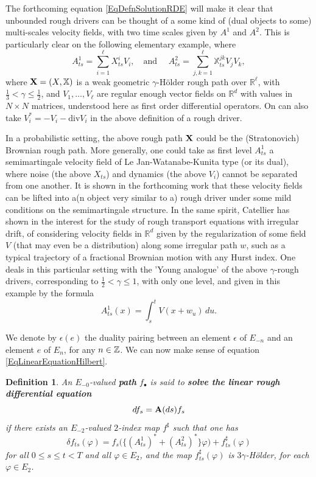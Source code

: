 \documentclass[11pt,a4paper]{amsart}
\newcommand{\RR}{\mathbb{R}}  \newcommand{\CC}{\mathbb{C}}  \newcommand{\LL}{\mathbb{L}}  \newcommand{\WW}{\mathbb{W}}
\newcommand{\bbX}{\mathbb{X}}
\newcommand{\ep}{\epsilon}
\renewcommand{\leq}{\leqslant}
\newcommand{\ssk}{\smallskip}
\newtheorem{defn}[thm]{ \hspace{-0.3cm} {\sc Definition}}%
\numberwithin{equation}{section} %
\begin{document}
\medskip

The forthcoming equation \eqref{EqDefnSolutionRDE} will make it clear that unbounded rough drivers can be thought of a some kind of (dual objects to some) multi-scales velocity fields, with two time scales given by $A^1$ and $A^2$. This is particularly clear on the following elementary example, where
$$
A^1_{ts} = \sum_{i=1}^\ell X^i_{ts}V_i, \quad \textrm{and } \quad A^2_{ts} = \sum_{j,k=1}^\ell \bbX^{jk}_{ts}V_jV_k,
$$
where ${\bfX} = (X,\bbX)$ is a weak geometric $\gamma$-H\"older rough path over $\RR^\ell$, with $\frac{1}{3}<\gamma\leq \frac{1}{2}$, and $V_1,\dots, V_\ell$ are regular enough vector fields on $\RR^d$ with values in $N\times N$ matrices, understood here as first order differential operators. On can also take $V_i^* = -V_i - \textrm{div}V_i$ in the above definition of a rough driver.

\ssk

In a probabilistic setting, the above rough path ${\bf X}$ could be the (Stratonovich) Brownian rough path. More generally, one could take as first level $A^1_{ts}$ a semimartingale velocity field of Le Jan-Watanabe-Kunita type (or its dual), where noise (the above $X_{ts}$) and dynamics (the above $V_i$) cannot be separated from one another. It is shown in the forthcoming work \cite{BailleulRiedel} that these velocity fields can be lifted into a(n object very similar to a) rough driver under some mild conditions on the semimartingale structure. In the same spirit, Catellier has shown in \cite{CatellierRegularization, CatellierTransport} the interest for the study of rough transport equations with irregular drift, of considering velocity fields in $\RR^d$ given by the regularization of some field $V$ (that may even be a distribution) along some irregular path $w$, such as a typical trajectory of a fractional Brownian motion with any Hurst index. One deals in this particular setting with the 'Young analogue' of the above $\gamma$-rough drivers, corresponding to $\frac{1}{2}<\gamma\leq 1$, with only one level, and given in this example by the formula
$$
A^1_{ts}(x) = \int_s^t V(x+w_u)\,du.
$$

\medskip

We denote by $\ep(e)$ the duality pairing between an element $\ep$ of $E_{-n}$ and an element $e$ of $E_n$, for any $n\in\mathbb{Z}$. We can now make sense of equation \eqref{EqLinearEquationHilbert}. 

\begin{defn}
\label{DefnSolutionEquation}
An $E_{-0}$-valued \emph{\textbf{path}} $f_\bullet$ is said to \emph{\textbf{ solve the linear rough differential equation}}
\begin{equation}
\label{EqRDE}
df_s = {\bf A}(ds)f_s
\end{equation}
if there exists an $E_{-2}$-valued $2$-index map $f^\sharp$ such that one has
\begin{equation}
\label{EqDefnSolutionRDE}
\delta f_{ts}(\varphi) = f_s\Big(\big\{(A^1_{ts})^*+(A^2_{ts})^*\big\}\varphi\Big) + f^\sharp_{ts}(\varphi)
\end{equation}
for all $0\leq s\leq t<T$ and all $\varphi\in E_2$, and the map $f^\sharp_{ts}(\varphi)$ is $3\gamma$-H\"older, for each $\varphi\in E_2$.
\end{defn}
\end{document}
